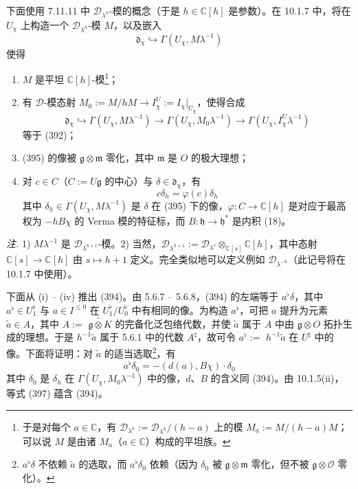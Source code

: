  下面使用 7.11.11 中 $\mathcal{D}_{\lambda^{h}}$-模的概念（于是 $h\in\mathbb{C}[h]$ 是参数）。在 10.1.7 中，将在 $U_{\chi}$ 上构造一个 $\mathcal{D}_{\lambda^{h}}$-模 $M$，以及嵌入
\begin{equation}\tag{395}
\mathfrak{d}_{\chi}\hookrightarrow\Gamma(U_{\chi},M\lambda^{-1})
\end{equation}
使得
\begin{enumerate}[label=(\roman*),leftmargin=2.2em]
\item $M$ 是平坦 $\mathbb{C}[h]$-模\footnote{于是对每个 $a\in\mathbb{C}$，有 $\mathcal{D}_{\lambda^{a}}:=\mathcal{D}_{\lambda^{h}}/(h-a)$ 上的模 $M_{a}:=M/(h-a)M$；可以说 $M$ 是由诸 $M_{a}$（$a\in\mathbb{C}$）构成的平坦族。}；
\item 有 $\mathcal{D}$-模态射 $M_{0}:=M/hM\to I^{U}_{\chi}:=I_{\chi}|_{U_{\chi}}$，使得合成
\[
\mathfrak{d}_{\chi}\hookrightarrow\Gamma(U_{\chi},M\lambda^{-1})\to\Gamma(U_{\chi},M_{0}\lambda^{-1})\to\Gamma(U_{\chi},I^{U}_{\chi}\lambda^{-1})
\]
等于 (392)；
\item (395) 的像被 $\mathfrak{g}\otimes\mathfrak{m}$ 零化，其中 $\mathfrak{m}$ 是 $O$ 的极大理想；
\item 对 $c\in C$（$C:=U\mathfrak{g}$ 的中心）与 $\delta\in\mathfrak{d}_{\chi}$，有
\begin{equation}\tag{396}
c\delta_{h}=\varphi(c)\delta_{h}
\end{equation}
其中 $\delta_{h}\in\Gamma(U_{\chi},M\lambda^{-1})$ 是 $\delta$ 在 (395) 下的像，$\varphi:C\to\mathbb{C}[h]$ 是对应于最高权为 $-hB\chi$ 的 Verma 模的特征标，而 $B:\mathfrak{h}\to\mathfrak{h}^{*}$ 是内积 (18)。
\end{enumerate}

\emph{注.} 1) $M\lambda^{-1}$ 是 $\mathcal{D}_{\lambda^{h+1}}$-模。2) 当然，$\mathcal{D}_{\lambda^{h+1}}:=\mathcal{D}_{\lambda^{s}}\otimes_{\mathbb{C}[s]}\mathbb{C}[h]$，其中态射 $\mathbb{C}[s]\to\mathbb{C}[h]$ 由 $s\mapsto h+1$ 定义。完全类似地可以定义例如 $\mathcal{D}_{\lambda^{-h}}$（此记号将在 10.1.7 中使用）。

 下面从 (i) – (iv) 推出 (394)。由 5.6.7 – 5.6.8，(394) 的左端等于 $a^{\flat}\delta$，其中 $a^{\flat}\in U^{\flat}_{1}$ 与 $a\in I^{\le 0}$ 在 $U^{\flat}_{1}/U^{\flat}_{0}$ 中有相同的像。为构造 $a^{\flat}$，可把 $a$ 提升为元素 $\tilde a\in A$，其中 $A:=$ $\widetilde{\mathfrak{g}\otimes K}$ 的完备化泛包络代数，并使 $\tilde a$ 属于 $A$ 中由 $\mathfrak{g}\otimes O$ 拓扑生成的理想。于是 $h^{-1}\tilde a$ 属于 5.6.1 中的代数 $A^{\natural}$，故可令 $a^{\flat}:=$ $h^{-1}\tilde a$ 在 $U^{\natural}$ 中的像。下面将证明：对 $\tilde a$ 的适当选取\footnote{$a^{\flat}\delta$ 不依赖 $\tilde a$ 的选取，而 $a^{\flat}\delta_{0}$ 依赖（因为 $\delta_{0}$ 被 $\mathfrak{g}\otimes\mathfrak{m}$ 零化，但不被 $\mathfrak{g}\otimes\mathcal{O}$ 零化）。}，有
\begin{equation}\tag{397}
a^{\flat}\delta_{0}=-(d(a),B\chi)\cdot\delta_{0}
\end{equation}
其中 $\delta_{0}$ 是 $\delta_{h}$ 在 $\Gamma(U_{\chi},M_{0}\lambda^{-1})$ 中的像，$d$、$B$ 的含义同 (394)。由 10.1.5(ii)，等式 (397) 蕴含 (394)。

